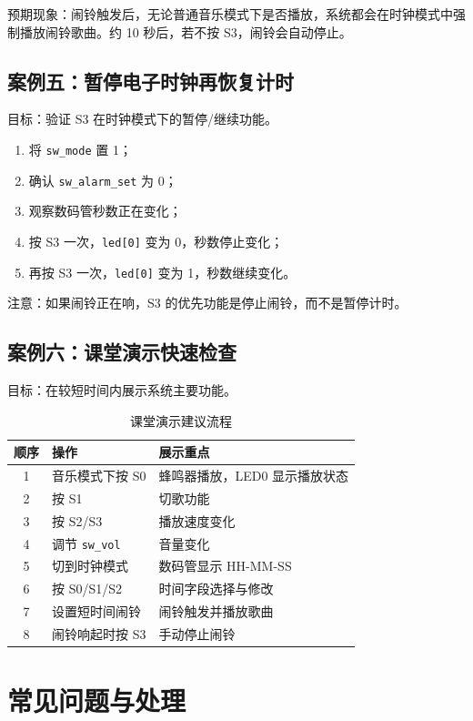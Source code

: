 \documentclass[UTF8,a4paper,12pt]{ctexart}
\newcommand{\port}[1]{\texttt{#1}}
\begin{document}
预期现象：闹铃触发后，无论普通音乐模式下是否播放，系统都会在时钟模式中强制播放闹铃歌曲。约 10 秒后，若不按 S3，闹铃会自动停止。

\subsection{案例五：暂停电子时钟再恢复计时}

目标：验证 S3 在时钟模式下的暂停/继续功能。

\begin{enumerate}
  \item 将 \port{sw\_mode} 置 1；
  \item 确认 \port{sw\_alarm\_set} 为 0；
  \item 观察数码管秒数正在变化；
  \item 按 S3 一次，\port{led[0]} 变为 0，秒数停止变化；
  \item 再按 S3 一次，\port{led[0]} 变为 1，秒数继续变化。
\end{enumerate}

注意：如果闹铃正在响，S3 的优先功能是停止闹铃，而不是暂停计时。

\subsection{案例六：课堂演示快速检查}

目标：在较短时间内展示系统主要功能。

\begin{table}[H]
  \centering
  \caption{课堂演示建议流程}
  \begin{tabular}{cll}
    \toprule
    顺序 & 操作 & 展示重点 \\
    \midrule
    1 & 音乐模式下按 S0 & 蜂鸣器播放，LED0 显示播放状态 \\
    2 & 按 S1 & 切歌功能 \\
    3 & 按 S2/S3 & 播放速度变化 \\
    4 & 调节 \port{sw\_vol} & 音量变化 \\
    5 & 切到时钟模式 & 数码管显示 HH-MM-SS \\
    6 & 按 S0/S1/S2 & 时间字段选择与修改 \\
    7 & 设置短时间闹铃 & 闹铃触发并播放歌曲 \\
    8 & 闹铃响起时按 S3 & 手动停止闹铃 \\
    \bottomrule
  \end{tabular}
\end{table}

\section{常见问题与处理}
\end{document}
